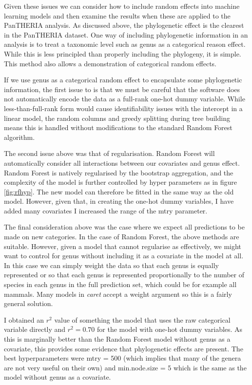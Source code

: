 \documentclass[10pt,]{article}
\begin{document}
Given these issues we can consider how to include random effects into machine learning models and then examine the results when these are applied to the PanTHERIA analysis. As discussed above, the phylogenetic effect is the clearest in the PanTHERIA dataset. One way of including phylogenetic information in an analysis is to treat a taxonomic level such as genus as a categorical reason effect. While this is less principled than properly including the phylogeny, it is simple. This method also allows a demonstration of categorical random effects.

If we use genus as a categorical random effect to encapsulate some phylogenetic information, the first issue to is that we must be careful that the software does not automatically encode the data as a full-rank one-hot dummy variable. While less-than-full-rank form would cause identifiability issues with the intercept in a linear model, the random columns and greedy splitting during tree building means this is handled without modifications to the standard Random Forest algorithm.

The second issue above was that of regularisation. Random Forest will automatically consider all interactions between our covariates and genus effect. Random Forest is natively regularised by the bootstrap aggregation, and the complexity of the model is further controlled by hyper parameters as in figure \ref{fig:rfhyp}. The new model can therefore be fitted in the same way as the old model. However, given that, in creating the one-hot dummy variables, I have added many covariates I increased the range of the mtry parameter.

The final consideration above was the case where we expect all predictions to be made on new categories. In the case of Random Forest, the above methods are suitable. However, given a model that cannot regularise as effectively, we might want to control for genus without including it as a covariate in the model at all. In this case we can simply weight the data so that each genus is equally represented or so that each genus is represented proportionally to the number of species in each genus in the full prediction set, which could be for example all mammals. Many models in \emph{caret} accept a weight argument so this is a fairly general solution.

I obtained an \(r^2\) value of something the model that uses the raw categorical variable directly and \(r^2 = 0.70\) for the model with one-hot dummy variables. As this is marginally better than the Random Forest model without genus as a covariate, this provides some evidence that phylogenetic effects are present. The best hyperparameters were mtry = 500 (which implies that many of the genera are not very useful on their own) and min.node.size = 5 which is the same as the model without genus as a covariate.
\end{document}
